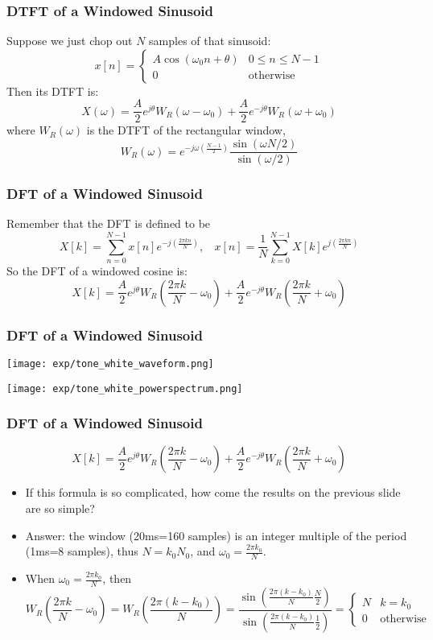 


\begin{frame}
  \frametitle{DTFT of a Windowed Sinusoid}

  Suppose we just chop  out $N$ samples of that sinusoid:
  \[
  x[n]=\begin{cases}
  A\cos\left(\omega_0 n+\theta\right) & 0\le n\le N-1\\
  0 & \mbox{otherwise}
  \end{cases}
  \]
  Then its DTFT is:
  \[
  X(\omega) = \frac{A}{2}e^{j\theta}W_R(\omega-\omega_0)+\frac{A}{2}e^{-j\theta}W_R(\omega+\omega_0)
  \]
  where $W_R(\omega)$ is the DTFT of the rectangular window,
  \[
  W_R(\omega) = e^{-j\omega\left(\frac{N-1}{2}\right)}\frac{\sin(\omega N/2)}{\sin(\omega/2)}
  \]
\end{frame}

\begin{frame}
  \frametitle{DFT of a Windowed Sinusoid}

  Remember that the DFT is defined to be
  \[
  X[k]=\sum_{n=0}^{N-1}x[n]e^{-j\left(\frac{2\pi kn}{N}\right)},~~~~
  x[n]=\frac{1}{N}\sum_{k=0}^{N-1}X[k]e^{j\left(\frac{2\pi kn}{N}\right)}
  \]
  So the DFT of a windowed cosine is:
  \[
  X[k] = \frac{A}{2}e^{j\theta}W_R\left(\frac{2\pi k}{N}-\omega_0\right)+
  \frac{A}{2}e^{-j\theta}W_R\left(\frac{2\pi k}{N}+\omega_0\right)
  \]
\end{frame}

\begin{frame}
  \frametitle{DFT of a Windowed Sinusoid}
  \centerline{\texttt{[image: exp/tone\_white\_waveform.png]}}
  \centerline{\texttt{[image: exp/tone\_white\_powerspectrum.png]}}
\end{frame}

\begin{frame}
  \frametitle{DFT of a Windowed Sinusoid}
  \[
  X[k] = \frac{A}{2}e^{j\theta}W_R\left(\frac{2\pi k}{N}-\omega_0\right)+
  \frac{A}{2}e^{-j\theta}W_R\left(\frac{2\pi k}{N}+\omega_0\right)
  \]
  \begin{itemize}
  \item If this formula is so complicated, how come the results on the
    previous slide are so simple?
  \item Answer: the window (20ms=160 samples) is an integer multiple of
    the period (1ms=8 samples), thus $N=k_0 N_0$, and $\omega_0=\frac{2\pi k_0}{N}$.
  \item When $\omega_0=\frac{2\pi k_0}{N}$, then
    \[
    W_R\left(\frac{2\pi k}{N}-\omega_0\right) = W_R\left(\frac{2\pi (k-k_0)}{N}\right)
    =
    \frac{\sin\left(\frac{2\pi (k-k_0)}{N}\frac{N}{2}\right)}{\sin\left(\frac{2\pi (k-k_0)}{N}\frac{1}{2}\right)}
    =\begin{cases}
    N & k=k_0\\
    0 & \mbox{otherwise}
    \end{cases}
    \]
  \end{itemize}
\end{frame}

